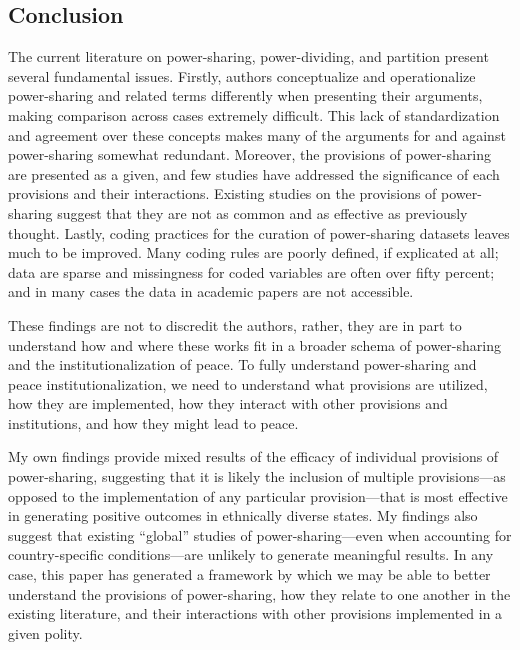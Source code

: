 \documentclass[12pt]{article}
\begin{document}
\subsection{Conclusion}
The current literature on power-sharing, power-dividing, and partition present several fundamental issues. Firstly, authors conceptualize and operationalize power-sharing and related terms differently when presenting their arguments, making comparison across cases extremely difficult. This lack of standardization and agreement over these concepts makes many of the arguments for and against power-sharing somewhat redundant. Moreover, the provisions of power-sharing are presented as a given, and few studies have addressed the significance of each provisions and their interactions. Existing studies on the provisions of power-sharing suggest that they are not as common and as effective as previously thought. Lastly, coding practices for the curation of power-sharing datasets leaves much to be improved. Many coding rules are poorly defined, if explicated at all; data are sparse and missingness for coded variables are often over fifty percent; and in many cases the data in academic papers are not accessible. 

These findings are not to discredit the authors, rather, they are in part to understand how and where these works fit in a broader schema of power-sharing and the institutionalization of peace. To fully understand power-sharing and peace institutionalization, we need to understand what provisions are utilized, how they are implemented, how they interact with other provisions and institutions, and how they might lead to peace.

My own findings provide mixed results of the efficacy of individual provisions of power-sharing, suggesting that it is likely the inclusion of multiple provisions—as opposed to the implementation of any particular provision—that is most effective in generating positive outcomes in ethnically diverse states. My findings also suggest that existing “global” studies of power-sharing—even when accounting for country-specific conditions—are unlikely to generate meaningful results. In any case, this paper has generated a framework by which we may be able to better understand the provisions of power-sharing, how they relate to one another in the existing literature, and their interactions with other provisions implemented in a given polity.

\pagebreak

\nocite{*}


\end{document}

